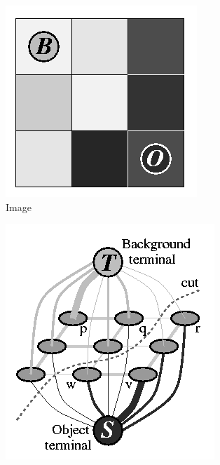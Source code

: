 \begin{figure}[h]
    \centering
    \begin{subfigure}[b]{0.3\textwidth}
        \centering
        \includegraphics[width=\textwidth]{figures/iccv01-001.png}
        \caption{Image}
    \end{subfigure}
    \hfill
    \begin{subfigure}[b]{0.3\textwidth}
        \centering
        \includegraphics[width=\textwidth]{figures/iccv01-003.png}

\end{subfigure}
\end{figure}
